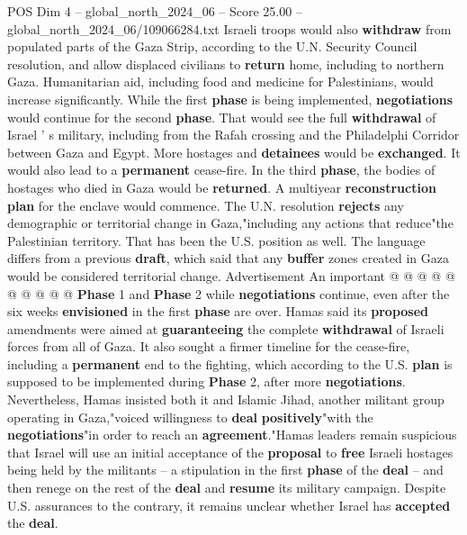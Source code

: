 \begin{textsample}{POS Dim 4 – global\_north\_2024\_06 – Score 25.00 – global\_north\_2024\_06/109066284.txt}  \label{ex:f4_pos_134}
Israeli troops would also \textbf{withdraw} from populated parts of the Gaza Strip, according to the U.N.
Security Council resolution, and allow displaced civilians to \textbf{return} home, including to northern Gaza.
Humanitarian aid, including food and medicine for Palestinians, would increase significantly.
While the first \textbf{phase} is being implemented, \textbf{negotiations} would continue for the second \textbf{phase}.
That would see the full \textbf{withdrawal} of Israel ' s military, including from the Rafah crossing and the Philadelphi Corridor between Gaza and Egypt.
More hostages and \textbf{detainees} would be \textbf{exchanged}.
It would also lead to a \textbf{permanent} cease-fire.
In the third \textbf{phase}, the bodies of hostages who died in Gaza would be \textbf{returned}.
A multiyear \textbf{reconstruction} \textbf{plan} for the enclave would commence.
The U.N. resolution \textbf{rejects} any demographic or territorial change in Gaza,"including any actions that reduce"the Palestinian territory.
That has been the U.S. position as well.
The language differs from a previous \textbf{draft}, which said that any \textbf{buffer} zones created in Gaza would be considered territorial change.
Advertisement An important @ @ @ @ @ @ @ @ @ @ \textbf{Phase} 1 and \textbf{Phase} 2 while \textbf{negotiations} continue, even after the six weeks \textbf{envisioned} in the first \textbf{phase} are over.
Hamas said its \textbf{proposed} amendments were aimed at \textbf{guaranteeing} the complete \textbf{withdrawal} of Israeli forces from all of Gaza.
It also sought a firmer timeline for the cease-fire, including a \textbf{permanent} end to the fighting, which according to the U.S. \textbf{plan} is supposed to be implemented during \textbf{Phase} 2, after more \textbf{negotiations}.
Nevertheless, Hamas insisted both it and Islamic Jihad, another militant group operating in Gaza,"voiced willingness to \textbf{deal} \textbf{positively}"with the \textbf{negotiations}"in order to reach an \textbf{agreement}."Hamas leaders remain suspicious that Israel will use an initial acceptance of the \textbf{proposal} to \textbf{free} Israeli hostages being held by the militants -- a stipulation in the first \textbf{phase} of the \textbf{deal} -- and then renege on the rest of the \textbf{deal} and \textbf{resume} its military campaign.
Despite U.S. assurances to the contrary, it remains unclear whether Israel has \textbf{accepted} the \textbf{deal}.

\end{textsample}
